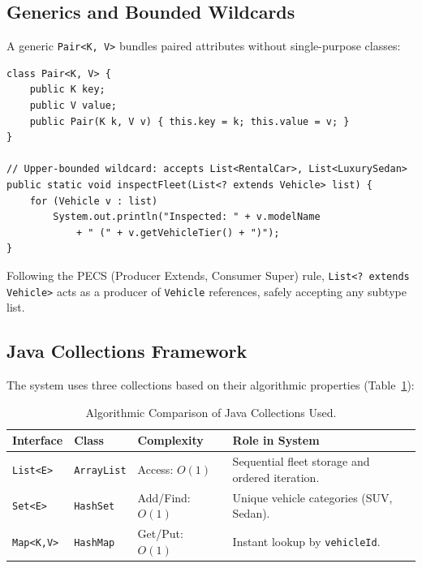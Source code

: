 \documentclass[11pt,a4paper]{article}
\begin{document}
\subsection{Generics and Bounded Wildcards}

A generic \texttt{Pair<K, V>} bundles paired attributes without single-purpose classes:
\begin{lstlisting}[caption={Generic Pair and Bounded Wildcard}]
class Pair<K, V> {
    public K key;
    public V value;
    public Pair(K k, V v) { this.key = k; this.value = v; }
}

// Upper-bounded wildcard: accepts List<RentalCar>, List<LuxurySedan>
public static void inspectFleet(List<? extends Vehicle> list) {
    for (Vehicle v : list)
        System.out.println("Inspected: " + v.modelName
            + " (" + v.getVehicleTier() + ")");
}
\end{lstlisting}
Following the PECS (Producer Extends, Consumer Super) rule, \texttt{List<? extends Vehicle>} acts as a producer of \texttt{Vehicle} references, safely accepting any subtype list.

\subsection{Java Collections Framework}
The system uses three collections based on their algorithmic properties (Table~\ref{tab:collections_comparison}):

\begin{table}[h!]
\centering
\small
\begin{tabularx}{\textwidth}{l l l p{5.0cm}}
\toprule
\textbf{Interface} & \textbf{Class} & \textbf{Complexity} & \textbf{Role in System} \\
\midrule
\texttt{List<E>} & \texttt{ArrayList} & Access: $O(1)$ & Sequential fleet storage and ordered iteration. \\
\addlinespace
\texttt{Set<E>} & \texttt{HashSet} & Add/Find: $O(1)$ & Unique vehicle categories (SUV, Sedan). \\
\addlinespace
\texttt{Map<K,V>} & \texttt{HashMap} & Get/Put: $O(1)$ & Instant lookup by \texttt{vehicleId}. \\
\bottomrule
\end{tabularx}
\caption{Algorithmic Comparison of Java Collections Used.}
\label{tab:collections_comparison}
\end{table}
\end{document}

